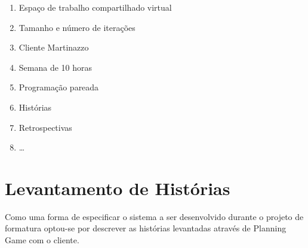 \documentclass[a4paper,12pt,font=plain,header=plain]{abnt}
\begin{document}
      \begin{enumerate}
        \item{Espaço de trabalho compartilhado virtual}
        \item{Tamanho e número de iterações}
        \item{Cliente Martinazzo}
        \item{Semana de 10 horas}
        \item{Programação pareada}
        \item{Histórias}
        \item{Retrospectivas}
        \item{\ldots}
      \end{enumerate}

  \section{Levantamento de Histórias}

	Como uma forma de especificar o sistema a ser desenvolvido durante o projeto de formatura optou-se por descrever as histórias levantadas através de Planning Game com o cliente.
\end{document}
